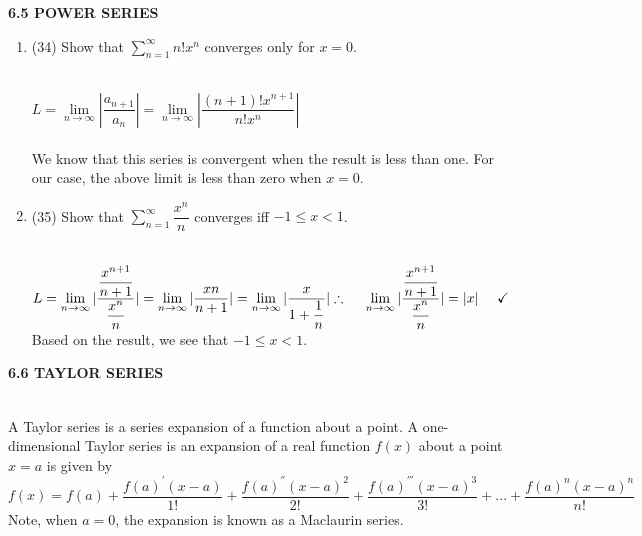 \documentclass[fleqn]{article}
\begin{document}
  \textbf{6.5 POWER SERIES}
  \begin{enumerate}
    \item (34) Show that $\sum\limits_{n=1}^{\infty} n! x^n$ converges only for $x=0$.

      \textcolor{hwColor}{
        \\
        $
          L=\lim\limits_{n \to \infty} |\dfrac{a_{n+1}}{a_n}|=\lim\limits_{n \to \infty} |\dfrac{(n+1)! x^{n+1}}{n! x^n}|
        $
        \\
        \\
        We know that this series is convergent when the result is less than one. For our case, the above limit is less than zero 
        when $x=0$. 
        \\
      }

    \item (35) Show that $\sum\limits_{n=1}^{\infty} \dfrac{x^n}{n}$ converges iff $-1 \leq x <1$.

      \textcolor{hwColor}{
        \\
        $ 
          L=\lim\limits_{n \to \infty} |\dfrac{\dfrac{x^{n+1}}{n+1}}{\dfrac{x^n}{n}}|
          =\lim\limits_{n \to \infty} |\dfrac{xn}{n+1}|=\lim\limits_{n \to \infty} |\dfrac{x}{1+\dfrac{1}{n}}|
          \\
          \\
          \therefore ~~~~ \lim\limits_{n \to \infty} |\dfrac{\dfrac{x^{n+1}}{n+1}}{\dfrac{x^n}{n}}|=|x| ~~~~ \checkmark
          \\
          \\
        $ 
        Based on the result, we see that $-1 \leq x <1$. 
        \\
      }


          

  \end{enumerate}

  \pagebreak

  \textbf{6.6 TAYLOR SERIES}

    \textcolor{hwColor}{
      \\
      A Taylor series is a series expansion of a function about a point. A one-dimensional Taylor series is an 
      expansion of a real function $f(x)$ about a point $x=a$ is given by
      $$
        f(x)=f(a)+\dfrac{f(a)^' (x-a)}{1!}+\dfrac{f(a)^{''} (x-a)^2}{2!}+\dfrac{f(a)^{'''} (x-a)^3}{3!}+...+\dfrac{f(a)^n (x-a)^n}{n!}
      $$
      Note, when $a=0$, the expansion is known as a Maclaurin series.
    }
\end{document}
